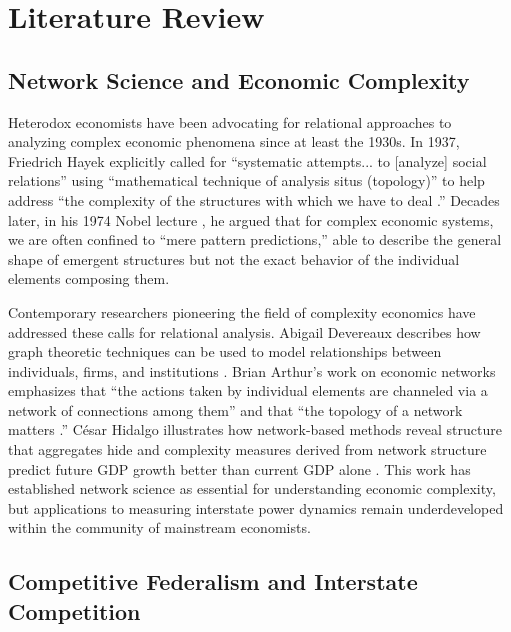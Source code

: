 \documentclass[12pt,oneside]{book}
\begin{document}
\chapter{Literature Review}

\section{Network Science and Economic Complexity}

Heterodox economists have been advocating for relational approaches to analyzing complex economic phenomena since at least the 1930s. In 1937, Friedrich Hayek explicitly called for ``systematic attempts... to [analyze] social relations'' using ``mathematical technique of analysis situs (topology)'' to help address ``the complexity of the structures with which we have to deal \cite{von_hayek_economics_1937}.'' Decades later, in his 1974 Nobel lecture \cite{hayek_pretense_1974}, he argued that for complex economic systems, we are often confined to ``mere pattern predictions,'' able to describe the general shape of emergent structures but not the exact behavior of the individual elements composing them.

Contemporary researchers pioneering the field of complexity economics have addressed these calls for relational analysis. Abigail Devereaux describes how graph theoretic techniques can be used to model relationships between individuals, firms, and institutions \cite{devereaux_seven_2022}. Brian Arthur's work on economic networks emphasizes that ``the actions taken by individual elements are channeled via a network of connections among them'' and that ``the topology of a network matters \cite{arthur_foundations_2021}.'' C\'esar Hidalgo illustrates how network-based methods reveal structure that aggregates hide and complexity measures derived from network structure predict future GDP growth better than current GDP alone \cite{hidalgo_economic_2021}. This work has established network science as essential for understanding economic complexity, but applications to measuring interstate power dynamics remain underdeveloped within the community of mainstream economists.

\section{Competitive Federalism and Interstate Competition}
\end{document}
